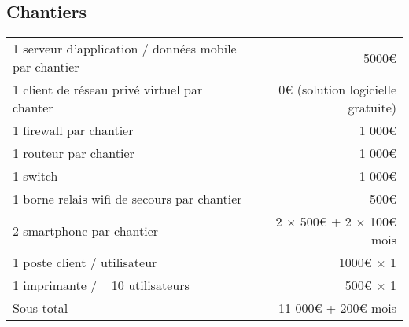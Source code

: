     \subsection{Chantiers}
        \begin{tabular*}{\textwidth}{ l @{\extracolsep{\fill}} r }
	        1 serveur d'application / données mobile par chantier     & 5000€ \\ 
	        1 client de réseau privé virtuel par chanter              & 0€ (solution logicielle gratuite)\\ 
	        1 firewall par chantier                                   & 1 000€ \\ 
	        1 routeur par chantier                                    & 1 000€ \\ 
	        1 switch                                                  & 1 000€ \\ 
	        1 borne relais wifi de secours par chantier               & 500€ \\ 
	        2 smartphone par chantier                                 & 2 $\times$ 500€ + 2 $\times$ 100€ \/ mois\\ 
	        1 poste client / utilisateur                              & 1000€ $\times$ 1 \\
	        1 imprimante / ~ 10 utilisateurs                          & 500€ $\times$ 1 \\ \hline
	        Sous total                                                & 11 000€ + 200€ \/mois
        \end{tabular*}
